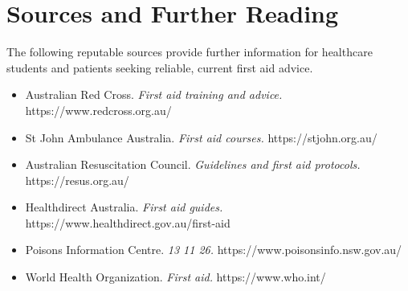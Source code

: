 \section*{Sources and Further Reading}
The following reputable sources provide further information for healthcare students and patients seeking reliable, current first aid advice.
\begin{itemize}
    \item Australian Red Cross. \textit{First aid training and advice.} https://www.redcross.org.au/
    \item St John Ambulance Australia. \textit{First aid courses.} https://stjohn.org.au/
    \item Australian Resuscitation Council. \textit{Guidelines and first aid protocols.} https://resus.org.au/
    \item Healthdirect Australia. \textit{First aid guides.} https://www.healthdirect.gov.au/first-aid
    \item Poisons Information Centre. \textit{13 11 26.} https://www.poisonsinfo.nsw.gov.au/
    \item World Health Organization. \textit{First aid.} https://www.who.int/
\end{itemize}
